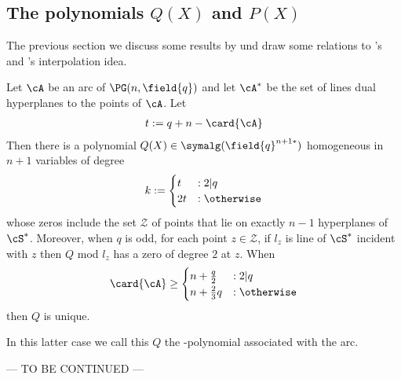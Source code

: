
\subsection{The polynomials $Q(X)$ and $P(X)$}

The previous section we discuss some results by  und draw some relations to 's and 's interpolation idea.

\begin{lemma}[Blokhuis]
  Let $\cA$ be an arc of $\PG(n,\field{q})$ and let $\cA^*$ be the set of lines dual hyperplanes
  to the points of $\cA$. Let
  \begin{align*}
    t:=q+n-\mathcal{\card{\cA}}
  \end{align*}
  Then there is a polynomial $Q(X)\in\symalg(\field{q}^{{n+1}*})$ homogeneous in $n+1$ variables of degree 
  \begin{equation}
    k:=\begin{cases}
      t &: 2|q\\
     2t &: \otherwise 
       \end{cases}
  \end{equation}
  whose zeros include the set $\mathcal{Z}$ of points that lie on exactly $n-1$ hyperplanes of $\cS^*$.
  Moreover, when $q$ is odd, for each point $z\in \mathcal{Z}$, if $l_z$ is line of $\cS^*$ incident with $z$ then $Q$ mod $l_z$ has a zero of degree $2$ at $z$.
  When 
  \begin{equation}
    \card{\cA}\geq \begin{cases}
      n+\frac{q}{2} &: 2|q \\
      n+\frac{2}{3}q &: \otherwise
  \end{cases}
  \end{equation}
  then $Q$ is unique.
\end{lemma}

In this latter case we call this $Q$ the -polynomial associated with the arc.

--- TO BE CONTINUED ---
